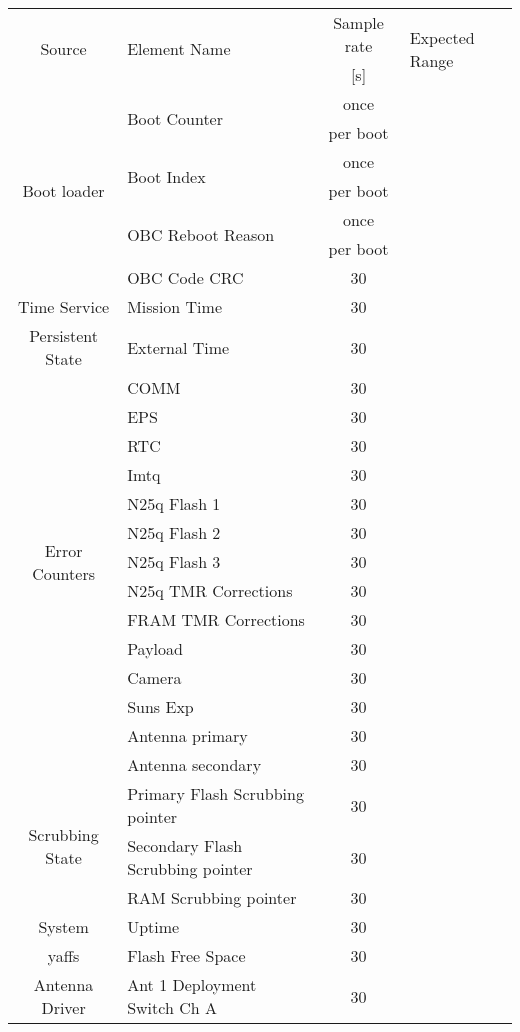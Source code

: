 \begin{longtable}{c|l|c|l}
    \toprule
    \multirow{2}{*}{Source}            & \multirow{2}{*}{Element Name}          & Sample rate & \multirow{2}{*}{Expected Range}  \\
    & & [s] & \\
    \midrule
    \endhead
    \multirow{7}{*}{Boot loader} & \multirow{2}{*}{Boot Counter}          & once \\
    & & per boot &  \\
    & \multirow{2}{*}{Boot Index}            & once \\
    & & per boot &  \\
    & \multirow{2}{*}{OBC Reboot Reason}     & once \\
    & & per boot &  \\
    & OBC Code CRC          & 30 \\
    \hline
    Time Service      & Mission Time          & 30 \\
    \hline
    Persistent State  & External Time         & 30 \\
    \hline
    \multirow{13}{*}{Error Counters} & COMM & 30 & \\
    & EPS & 30 \\
    & RTC & 30 \\
    & Imtq & 30 \\
    & N25q Flash 1 & 30 \\
    & N25q Flash 2 & 30 \\
    & N25q Flash 3 & 30 \\
    & N25q TMR Corrections & 30 \\
    & FRAM TMR Corrections & 30 \\
    & Payload & 30 \\
    & Camera & 30 \\
    & Suns Exp & 30 \\
    & Antenna primary & 30 \\
    & Antenna secondary & 30 \\
    \hline
    \multirow{3}{*}{Scrubbing State} & Primary Flash Scrubbing pointer & 30 \\
    & Secondary Flash Scrubbing pointer & 30 \\
    & RAM Scrubbing pointer & 30 \\
    \hline
    System & Uptime & 30 \\
    \hline
    yaffs & Flash Free Space & 30 \\
    \hline
    \multirow{42}{*}{Antenna Driver} & Ant 1 Deployment Switch Ch A & 30 \\

\end{longtable}

